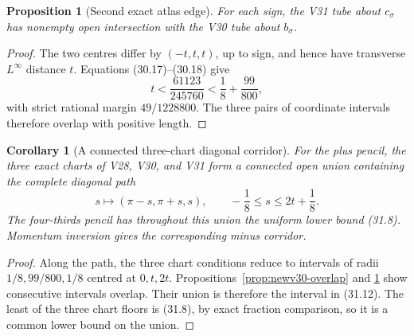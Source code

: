 \documentclass[11pt,oneside]{article}
\newtheorem{proposition}[theorem]{Proposition}
\newtheorem{corollary}[theorem]{Corollary}
\theoremstyle{definition}
\theoremstyle{remark}
\begin{document}
\begin{proposition}[Second exact atlas edge]
\label{prop:newv31-overlap}
For each sign, the V31 tube about \(c_\sigma\) has nonempty open
intersection with the V30 tube about \(b_\sigma\).
\end{proposition}

\begin{proof}
The two centres differ by \((-t,t,t)\), up to sign, and hence have
transverse \(L^\infty\) distance \(t\).  Equations (30.17)--(30.18)
give
\[
 t<\frac{61123}{245760}
 <\frac18+\frac{99}{800},
\]
with strict rational margin \(49/1228800\).  The three pairs of
coordinate intervals therefore overlap with positive length.
\end{proof}

\begin{corollary}[A connected three-chart diagonal corridor]
\label{cor:newv31-corridor}
For the plus pencil, the three exact charts of V28, V30, and V31
form a connected open union containing the complete diagonal path
\[
 s\longmapsto(\pi-s,\pi+s,s),\qquad
 -\frac18\le s\le2t+\frac18.                            \tag{31.12}
\]
The four-thirds pencil has throughout this union the uniform lower
bound (31.8).  Momentum inversion gives the corresponding minus
corridor.
\end{corollary}

\begin{proof}
Along the path, the three chart conditions reduce to intervals of
radii \(1/8,99/800,1/8\) centred at \(0,t,2t\).
Propositions~\ref{prop:newv30-overlap} and
\ref{prop:newv31-overlap} show consecutive intervals overlap.
Their union is therefore the interval in (31.12).  The least of the
three chart floors is (31.8), by exact fraction comparison, so it is
a common lower bound on the union.
\end{proof}
\end{document}
